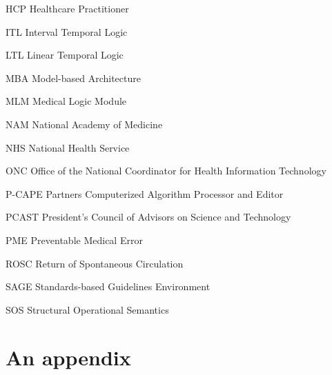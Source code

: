 \documentclass{uiucthesis2021}
\newcounter{counterforappendices}
\begin{document}
\begin{abbrevlist}
\item[HCP]      Healthcare Practitioner
\item[ITL]      Interval Temporal Logic
\item[LTL]      Linear Temporal Logic
\item[MBA]      Model-based Architecture
\item[MLM]      Medical Logic Module
\item[NAM]      National Academy of Medicine
\item[NHS]      National Health Service
\item[ONC]      Office of the National Coordinator for Health Information Technology
\item[P-CAPE]   Partners Computerized Algorithm Processor and Editor
\item[PCAST]    President's Council of Advisors on Science and Technology
\item[PME]      Preventable Medical Error
\item[ROSC]     Return of Spontaneous Circulation
\item[SAGE]     Standards-based Guidelines Environment
\item[SOS]      Structural Operational Semantics
\end{abbrevlist}

%

\mainmatter













\backmatter

\printbibliography[heading=bibintoc,title={References}]

\clearpage
\setcounter{counterforappendices}{\value{page}}
\mainmatter
\setcounter{page}{\value{counterforappendices}}

\appendix

\chapter{An appendix}


% 
\end{document}
